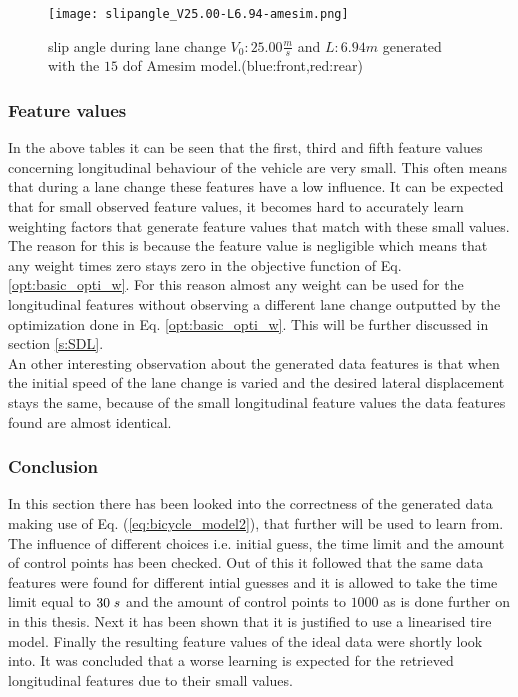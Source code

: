  \begin{figure}[h!]
	\centering
	\texttt{[image: slipangle\_V25.00-L6.94-amesim.png]}
	\caption{slip angle during lane change $V_0: 25.00 \frac{m}{s}$ and $L:6.94 m$ generated with the $15$ dof Amesim model.(blue:front,red:rear)}
	\label{fig:slip}
\end{figure}


\subsubsection{Feature values} \label{s:fv_val}
In the above tables it can be seen that the first, third and fifth feature values concerning longitudinal behaviour of the vehicle are very small. This often means that during a lane change these features have a low influence. It can be expected that for small observed feature values, it becomes hard to accurately learn weighting factors that generate feature values that match with these small values. The reason for this is because the feature value is negligible which means that any weight times zero stays zero in the objective function of Eq. \ref{opt:basic_opti_w}. For this reason almost any weight can be used for the longitudinal features without observing a different lane change outputted by the optimization done in Eq. \ref{opt:basic_opti_w}. This will be further discussed in section \ref{s:SDL}.\\%

An other interesting observation about the generated data features is that when the initial speed of the lane change is varied and the desired lateral displacement stays the same, because of the small longitudinal feature values the data features found are almost identical. 

\subsubsection{Conclusion}
In this section there has been looked into the correctness of the generated data making use of Eq. (\ref{eq:bicycle_model2}), that further will be used to learn from. The influence of different choices i.e. initial guess, the time limit and the amount of control points has been checked. Out of this it followed that the same data features were found for different intial guesses and it is allowed to take the time limit equal to $30 \hspace{1mm}s$ and the amount of control points to $1000$ as is done further on in this thesis. Next it has been shown that it is justified to use a linearised tire model. Finally the resulting feature values of the ideal data were shortly look into. It was concluded that a worse learning is expected for the retrieved longitudinal features due to their small values. 

